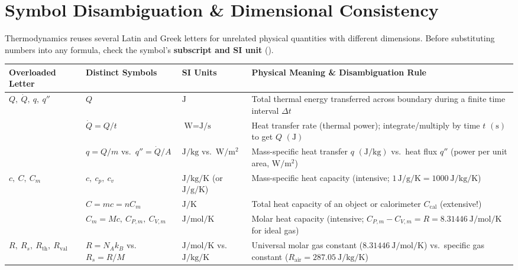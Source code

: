 \section{Symbol Disambiguation \& Dimensional Consistency}
\label{sec:02.2}

Thermodynamics reuses several Latin and Greek letters for unrelated physical quantities with different dimensions. Before substituting numbers into any formula, check the symbol's \textbf{subscript and SI unit} ().

\begin{center}
\label{tab:02:symcollision}
\footnotesize\setlength{\tabcolsep}{3.5pt}\renewcommand{\arraystretch}{1.13}
\begin{tabularx}{\linewidth}{@{}l l l X@{}}\toprule
\textbf{Overloaded Letter} & \textbf{Distinct Symbols} & \textbf{SI Units} & \textbf{Physical Meaning \& Disambiguation Rule} \\\midrule
\multirow{3}{*}{$Q,\ \dot{Q},\ q,\ q''$} & $Q$ & $\si{\joule}$ & Total thermal energy transferred across boundary during a finite time interval $\Delta t$ \\
 & $\dot{Q} = Q/t$ & $\si{\watt} = \si{\joule\per\second}$ & Heat transfer rate (thermal power); integrate/multiply by time $t$ $(\si{\second})$ to get $Q$ $(\si{\joule})$ \\
 & $q = Q/m$ vs.\ $q'' = \dot{Q}/A$ & $\si{\joule\per\kilogram}$ vs.\ $\si{\watt\per\square\meter}$ & Mass-specific heat transfer $q$ $(\si{\joule\per\kilogram})$ vs.\ heat flux $q''$ (power per unit area, $\si{\watt\per\square\meter}$) \\\midrule
\multirow{3}{*}{$c,\ C,\ C_m$} & $c,\ c_p,\ c_v$ & $\si{\joule\per\kilogram\per\kelvin}$ (or $\si{\joule\per\gram\per\kelvin}$) & Mass-specific heat capacity (intensive; $1\,\si{\joule\per\gram\per\kelvin} = \SI{1000}{\joule\per\kilogram\per\kelvin}$) \\
 & $C = mc = nC_m$ & $\si{\joule\per\kelvin}$ & Total heat capacity of an object or calorimeter $C_{\mathrm{cal}}$ (extensive!) \\
 & $C_m = Mc,\ C_{P,m},\ C_{V,m}$ & $\si{\joule\per\mole\per\kelvin}$ & Molar heat capacity (intensive; $C_{P,m} - C_{V,m} = R = \SI{8.31446}{\joule\per\mole\per\kelvin}$ for ideal gas) \\\midrule
\multirow{3}{*}{$R,\ R_s,\ R_{\mathrm{th}},\ R_{\mathrm{val}}$} & $R = N_A k_B$ vs.\ $R_s = R/M$ & $\si{\joule\per\mole\per\kelvin}$ vs.\ $\si{\joule\per\kilogram\per\kelvin}$ & Universal molar gas constant ($\SI{8.31446}{\joule\per\mole\per\kelvin}$) vs.\ specific gas constant ($R_{\mathrm{air}} = \SI{287.05}{\joule\per\kilogram\per\kelvin}$) \\

\end{tabularx}
\end{center}
